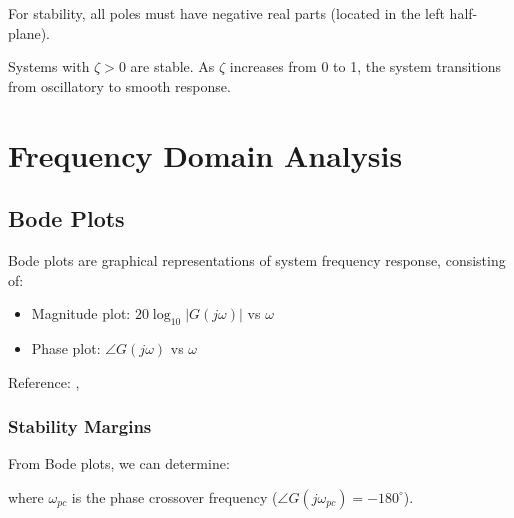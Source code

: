 \documentclass{../coursenotes}
\begin{document}


\begin{solution}
For stability, all poles must have negative real parts (located in the left half-plane).
\end{solution}

\begin{solution}
Systems with $\zeta > 0$ are stable. As $\zeta$ increases from 0 to 1, the system transitions from oscillatory to smooth response.
\end{solution}

\chapter{Frequency Domain Analysis} \label{chap:frequency}

\section{Bode Plots} \label{sec:bode}

Bode plots are graphical representations of system frequency response, consisting of:
\begin{itemize}
\item Magnitude plot: $20\log_{10}|G(j\omega)|$ vs $\omega$
\item Phase plot: $\angle G(j\omega)$ vs $\omega$
\end{itemize}

Reference: , 

\subsection{Stability Margins}

From Bode plots, we can determine:

\begin{mmath}
 \eq {}
\end{mmath}

where $\omega_{pc}$ is the phase crossover frequency ($\angle G(j\omega_{pc}) = -180^\circ$).
\end{document}
